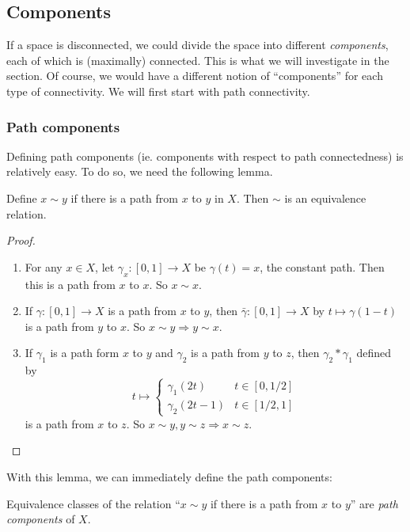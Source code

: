 \documentclass[a4paper]{article}
\begin{document}
\subsection{Components}
If a space is disconnected, we could divide the space into different \emph{components}, each of which is (maximally) connected. This is what we will investigate in the section. Of course, we would have a different notion of ``components'' for each type of connectivity. We will first start with path connectivity.

\subsubsection{Path components}
Defining path components (ie. components with respect to path connectedness) is relatively easy. To do so, we need the following lemma.

\begin{lemma}
  Define $x\sim y$ if there is a path from $x$ to $y$ in $X$. Then $\sim$ is an equivalence relation.
\end{lemma}

\begin{proof}\leavevmode
  \begin{enumerate}
    \item For any $x\in X$, let $\gamma_x: [0, 1] \to X$ be $\gamma(t) = x$, the constant path. Then this is a path from $x$ to $x$. So $x\sim x$.
    \item If $\gamma: [0, 1] \to X$ is a path from $x$ to $y$, then $\bar \gamma: [0, 1] \to X$ by $t \mapsto \gamma(1 - t)$ is a path from $y$ to $x$. So $x\sim y \Rightarrow y\sim x$.
    \item If $\gamma_1$ is a path form $x$ to $y$ and $\gamma_2$ is a path from $y$ to $z$, then $\gamma_2*\gamma_1$ defined by
      \[
        t\mapsto
        \begin{cases}
          \gamma_1(2t) & t\in [0, 1/2]\\
          \gamma_2(2t - 1) & t\in [1/2, 1]
        \end{cases}
      \]
      is a path from $x$ to $z$. So $x\sim y, y\sim z \Rightarrow x\sim z$.
  \end{enumerate}
\end{proof}

With this lemma, we can immediately define the path components:
\begin{defi}
  Equivalence classes of the relation ``$x\sim y$ if there is a path from $x$ to $y$'' are \emph{path components} of $X$.
\end{defi}
\end{document}
